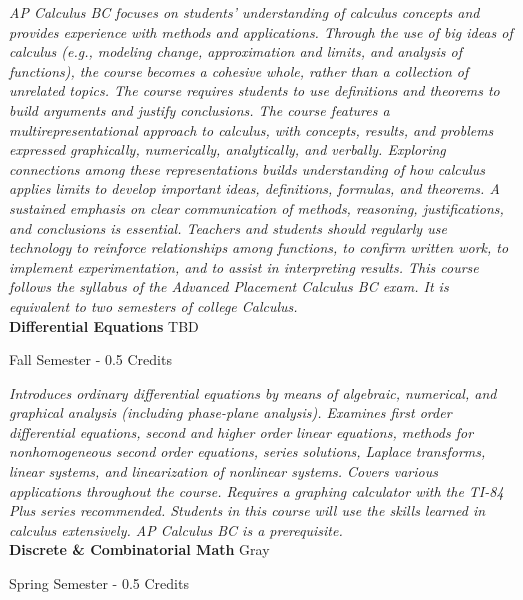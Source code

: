 \vspace{1mm}\emph{AP Calculus BC focuses on students’ understanding of calculus concepts and provides experience with methods and applications. Through the use of big ideas of calculus (e.g., modeling change, approximation and limits, and analysis of functions), the course becomes a cohesive whole, rather than a collection of unrelated topics. The course requires students to use definitions and theorems to build arguments and justify conclusions. The course features a multirepresentational approach to calculus, with concepts, results, and problems expressed graphically, numerically, analytically, and verbally. Exploring connections among these representations builds understanding of how calculus applies limits to develop important ideas, definitions, formulas, and theorems. A sustained emphasis on clear communication of methods, reasoning, justifications, and conclusions is essential. Teachers and students should regularly use technology to reinforce relationships among functions, to confirm written work, to implement experimentation, and to assist in interpreting results. This course follows the syllabus of the Advanced Placement Calculus BC exam. It is equivalent to two semesters of college Calculus.}\\


\noindent\textbf{Differential Equations} \hfill TBD

\noindent Fall Semester - 0.5 Credits

\vspace{1mm}\emph{Introduces ordinary differential equations by means of algebraic, numerical, and graphical analysis (including phase-plane analysis). Examines first order differential equations, second and higher order linear equations, methods for nonhomogeneous second order equations, series solutions, Laplace transforms, linear systems, and linearization of nonlinear systems. Covers various applications throughout the course. Requires a graphing calculator with the TI-84 Plus series recommended. Students in this course will use the skills learned in calculus extensively. AP Calculus BC is a prerequisite.}\\


\noindent\textbf{Discrete \& Combinatorial Math} \hfill Gray

\noindent Spring Semester - 0.5 Credits

